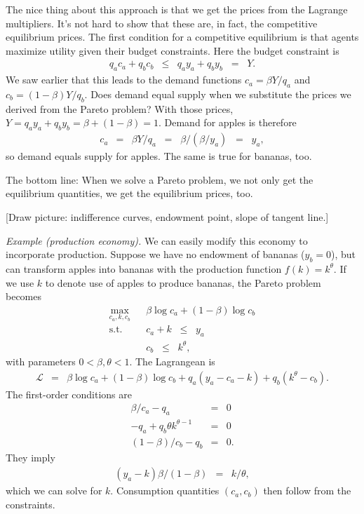 \documentclass[11pt]{article}
\begin{document}
The nice thing about this approach is that
we get the prices from the Lagrange multipliers.  
It's not hard to show that these are, in fact, 
the competitive equilibrium prices.
The first condition for a competitive equilibrium is that agents maximize
utility given their budget constraints.  
Here the budget constraint is 
\begin{eqnarray*}
    q_a c_a + q_b c_b &\leq& q_a y_a + q_b y_b \;\;=\;\; Y.
\end{eqnarray*}
We saw earlier that this leads to the demand functions 
$ c_a = \beta Y/q_a$ and $c_b = (1-\beta) Y/q_b$. 
Does demand equal supply when we substitute the prices we derived 
from the Pareto problem?  
With those prices, 
$ Y = q_a y_a + q_b y_b = \beta + (1-\beta) = 1$.  
Demand for apples is therefore 
\begin{eqnarray*}
    c_a &=& \beta Y / q_a \;\;=\;\; \beta / (\beta/y_a) \;\;=\;\; y_ a, 
\end{eqnarray*}
so demand equals supply for apples.  
The same is true for bananas, too.  

The bottom line:  When we solve a Pareto problem,
we not only get the equilibrium quantities,
we get the equilibrium prices, too.


[Draw picture:  indifference curves, endowment point,
slope of tangent line.]

{\it Example (production economy).\/}
We can easily modify this economy to incorporate production.
Suppose we have no endowment of bananas ($y_b=0$),
but can transform apples into bananas with the
production function $f(k) = k^\theta$.
If we use $k$ to denote use of apples to produce bananas,
the Pareto problem becomes
\begin{eqnarray*}
    \max_{c_a,k,c_b} &&  \beta \log c_a + (1-\beta) \log c_b \\
    \mbox{s.t.}   &&  c_a + k \;\;\leq\;\; y_a \\
                  &&  c_b \;\;\leq\;\; k^\theta ,
\end{eqnarray*}
with parameters $ 0 < \beta,\theta < 1$.
The Lagrangean is
\begin{eqnarray*}
    \mathcal{L} &=&  \beta \log c_a + (1-\beta) \log c_b
                + q_a (y_a - c_a - k) + q_b (k^\theta - c_b ) .
\end{eqnarray*}
The first-order conditions are
\begin{eqnarray*}
    \beta/c_a - q_a &=& 0 \\
    - q_a + q_b \theta k^{\theta-1} &=& 0 \\
   (1-\beta)/c_b - q_b &=& 0 .
\end{eqnarray*}
They imply
\begin{eqnarray*}
    (y_a - k) \beta /(1-\beta) &=& k / \theta ,
\end{eqnarray*}
which we can solve for $k$.
Consumption quantities $(c_a,c_b)$ then follow from the
constraints.
\end{document}

